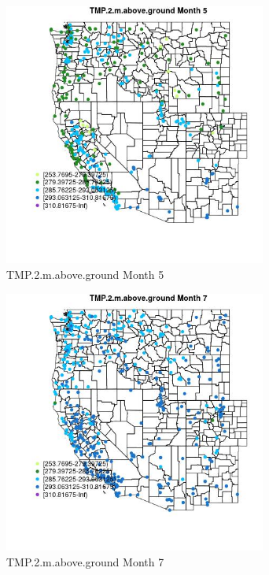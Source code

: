 \begin{figure} 
\centering  
\includegraphics[width=0.77\textwidth]{Code_Outputs/Report_ML_input_PM25_Step4_part_e_de_duplicated_aves_compiled_2019-05-18wNAs_MapObsMo5TMP2maboveground.jpg} 
\caption{\label{fig:Report_ML_input_PM25_Step4_part_e_de_duplicated_aves_compiled_2019-05-18wNAsMapObsMo5TMP2maboveground}TMP.2.m.above.ground Month 5} 
\end{figure} 
 

\begin{figure} 
\centering  
\includegraphics[width=0.77\textwidth]{Code_Outputs/Report_ML_input_PM25_Step4_part_e_de_duplicated_aves_compiled_2019-05-18wNAs_MapObsMo7TMP2maboveground.jpg} 
\caption{\label{fig:Report_ML_input_PM25_Step4_part_e_de_duplicated_aves_compiled_2019-05-18wNAsMapObsMo7TMP2maboveground}TMP.2.m.above.ground Month 7} 
\end{figure} 
 

